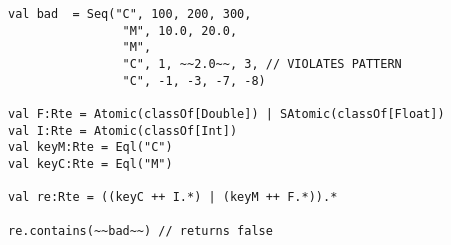 \begin{lstlisting}[style=scalaioScala]
val bad  = Seq("C", 100, 200, 300,
                "M", 10.0, 20.0,
                "M",
                "C", 1, ~~2.0~~, 3, // VIOLATES PATTERN
                "C", -1, -3, -7, -8)

val F:Rte = Atomic(classOf[Double]) | SAtomic(classOf[Float])
val I:Rte = Atomic(classOf[Int])
val keyM:Rte = Eql("C")
val keyC:Rte = Eql("M")

val re:Rte = ((keyC ++ I.*) | (keyM ++ F.*)).*

re.contains(~~bad~~) // returns false
\end{lstlisting}

